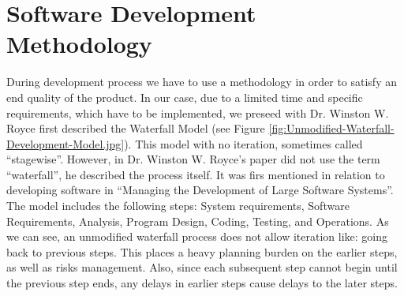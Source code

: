 \section{Software Development Methodology}

\par During development process we have to use a methodology in order to satisfy an end quality of the product. In our case, due to a limited time and specific requirements, which have to be implemented, we preseed with Dr. Winston W. Royce first described the Waterfall Model (see Figure \ref{fig:Unmodified-Waterfall-Development-Model.jpg}). This model with no iteration, sometimes called “stagewise”. However, in Dr. Winston W. Royce’s paper did not use the term “waterfall”, he described the process itself. It was firs mentioned in relation to developing software in “Managing the Development of Large Software Systems”. The model includes the following steps: System requirements, Software Requirements, Analysis, Program Design, Coding, Testing, and Operations. As we can see, an unmodified waterfall process does not allow iteration like: going back to previous steps. This places a heavy planning burden on the earlier steps, as well as risks management. Also, since each subsequent step cannot begin until the previous step ends, any delays in earlier steps cause delays to the later steps.

